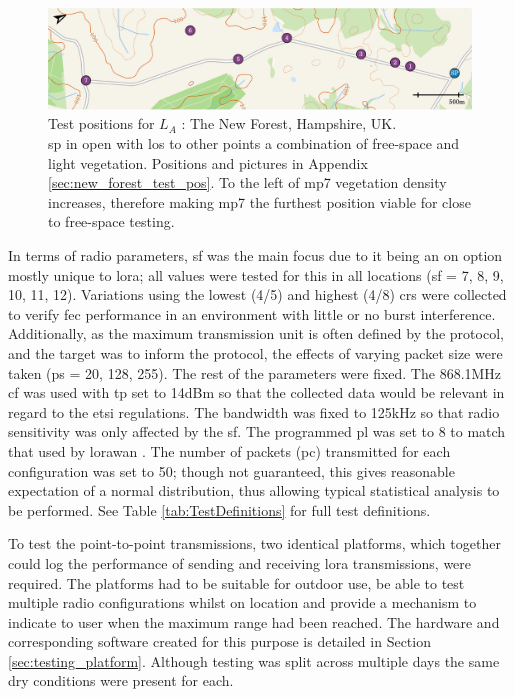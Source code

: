   \begin{figure}[H]
    \centering
    \includegraphics[width=\textwidth]{Figures/new_forest_light.pdf}
    \caption[Test Location: The New Forest, Hampshire, UK]{
    Test positions for \textbf{$L_A$} :  The New Forest, Hampshire, UK.\\
    \ac{sp} in open with \ac{los} to other points a combination of free-space and light vegetation. Positions and pictures in Appendix \ref{sec:new_forest_test_pos}. To the left of \ac{mp}7 vegetation density increases, therefore making \ac{mp}7 the furthest position viable for close to free-space testing.
    }
    \label{fig:new_forest_map}
\end{figure}


 In terms of radio parameters, \ac{sf} was the main focus due to it being an on option mostly unique to \ac{lora}; all values were tested for this in all locations (\ac{sf} = 7, 8, 9, 10, 11, 12). Variations using the lowest (4/5) and highest (4/8) \ac{cr}s were collected to verify \ac{fec} performance in an environment with little or no burst interference. Additionally, as the maximum transmission unit is often defined by the protocol, and the target was to inform the protocol, the effects of varying packet size were taken (\ac{ps} = 20, 128, 255). The rest of the parameters were fixed. The 868.1MHz \ac{cf} was used with \ac{tp} set to 14dBm so that the collected data would be relevant in regard to the \ac{etsi} regulations. The bandwidth was fixed to 125kHz so that radio sensitivity was only affected by the \ac{sf}. The programmed \ac{pl} was set to 8 to match that used by \ac{lorawan} \cite{3YP:LORAWAN_REGIONAL_PARAMS}. The number of packets (\ac{pc}) transmitted for each configuration was set to 50; though not guaranteed, this gives reasonable expectation of a normal distribution, thus allowing typical statistical analysis to be performed. See Table \ref{tab:TestDefinitions} for full test definitions.
 
 To test the point-to-point transmissions, two identical platforms, which together could log the performance of sending and receiving \ac{lora} transmissions, were required. The platforms had to be suitable for outdoor use, be able to test multiple radio configurations whilst on location and provide a mechanism to indicate to user when the maximum range had been reached. The hardware and corresponding software created for this purpose is detailed in Section \ref{sec:testing_platform}. Although testing was split across multiple days the same dry conditions were present for each.
 
